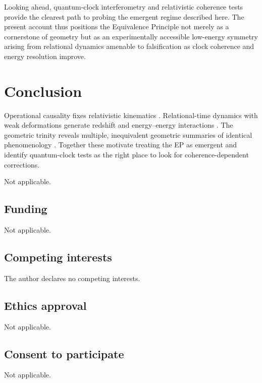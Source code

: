 \documentclass[11pt,a4paper]{article}
\theoremstyle{thmstyleone}
\theoremstyle{thmstyletwo}
\theoremstyle{thmstylethree}
\begin{document}
    Looking ahead, quantum-clock interferometry and relativistic coherence tests provide the clearest path to probing the emergent regime described here. The present account thus positions the Equivalence Principle not merely as a cornerstone of geometry but as an experimentally accessible low-energy symmetry arising from relational dynamics amenable to falsification as clock coherence and energy resolution improve.
    \section{Conclusion}\label{sec:conclusion}
    Operational causality fixes relativistic kinematics \cite{Pineda2026,Zeeman1964}. Relational-time dynamics with weak deformations generate redshift and energy--energy interactions \cite{SinghFriedrich2025,PageWootters1983}. The geometric trinity reveals multiple, inequivalent geometric summaries of identical phenomenology \cite{ManciniTinoCapozziello2025,BeltranJimenez2018}. Together these motivate treating the EP as emergent and identify quantum-clock tests as the right place to look for coherence-dependent corrections.

    \backmatter

    Not applicable.


    \subsection*{Funding}
        Not applicable.

    \subsection*{Competing interests}
        The author declares no competing interests.

    \subsection*{Ethics approval}
        Not applicable.

    \subsection*{Consent to participate}
        Not applicable.
\end{document}
